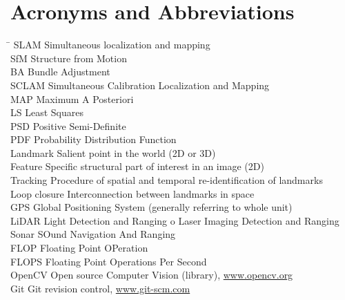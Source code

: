 \section*{Acronyms and Abbreviations}
\label{sec:acronyms}
\begin{tabbing}
	\hspace*{3.5cm}		\= \kill
	SLAM \> Simultaneous localization and mapping \\[1ex]
    SfM \> Structure from Motion \\[1ex]
    BA \> Bundle Adjustment \\[1ex]
    SCLAM \> Simultaneous Calibration Localization and Mapping \\[1ex]
    MAP \> Maximum A Posteriori \\[1ex]
    LS \> Least Squares \\[1ex]
    PSD \> Positive Semi-Definite \\[1ex]
    PDF \> Probability Distribution Function \\[1ex]
    Landmark \> Salient point in the world (2D or 3D) \\[1ex]
	Feature \> Specific structural part of interest in an image (2D) \\[1ex]
	Tracking \> Procedure of spatial and temporal re-identification of landmarks \\[1ex]
	Loop closure \> Interconnection between landmarks in space \\[1ex]
	GPS \> Global Positioning System (generally referring to whole unit) \\[1ex]
    LiDAR \> Light Detection and Ranging o Laser Imaging Detection and Ranging \\[1ex]
    Sonar \> SOund Navigation And Ranging \\[1ex]
    FLOP \> Floating Point OPeration \\[1ex]
    FLOPS \> Floating Point Operations Per Second \\[1ex]
	OpenCV  \> Open source Computer Vision (library), \url{www.opencv.org} \\[1ex]
	Git  \> Git revision control, \url{www.git-scm.com} \\[1ex]
\end{tabbing}
